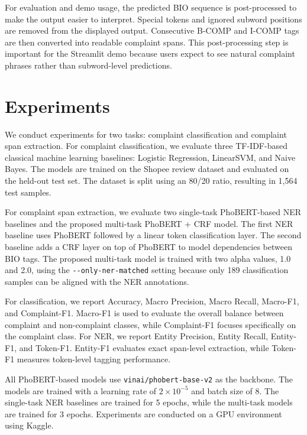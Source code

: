 \documentclass[11pt]{article}
\begin{document}
For evaluation and demo usage, the predicted BIO sequence is post-processed to make the output easier to interpret. Special tokens and ignored subword positions are removed from the displayed output. Consecutive B-COMP and I-COMP tags are then converted into readable complaint spans. This post-processing step is important for the Streamlit demo because users expect to see natural complaint phrases rather than subword-level predictions.

\section{Experiments}

We conduct experiments for two tasks: complaint classification and complaint span extraction. For complaint classification, we evaluate three TF-IDF-based classical machine learning baselines: Logistic Regression, LinearSVM, and Naive Bayes. The models are trained on the Shopee review dataset and evaluated on the held-out test set. The dataset is split using an 80/20 ratio, resulting in 1,564 test samples.

For complaint span extraction, we evaluate two single-task PhoBERT-based NER baselines and the proposed multi-task PhoBERT + CRF model. The first NER baseline uses PhoBERT followed by a linear token classification layer. The second baseline adds a CRF layer on top of PhoBERT to model dependencies between BIO tags. The proposed multi-task model is trained with two alpha values, 1.0 and 2.0, using the \verb|--only-ner-matched| setting because only 189 classification samples can be aligned with the NER annotations.

For classification, we report Accuracy, Macro Precision, Macro Recall, Macro-F1, and Complaint-F1. Macro-F1 is used to evaluate the overall balance between complaint and non-complaint classes, while Complaint-F1 focuses specifically on the complaint class. For NER, we report Entity Precision, Entity Recall, Entity-F1, and Token-F1. Entity-F1 evaluates exact span-level extraction, while Token-F1 measures token-level tagging performance.

All PhoBERT-based models use \texttt{vinai/phobert-base-v2} as the backbone. The models are trained with a learning rate of \(2 \times 10^{-5}\) and batch size of 8. The single-task NER baselines are trained for 5 epochs, while the multi-task models are trained for 3 epochs. Experiments are conducted on a GPU environment using Kaggle.
\end{document}
